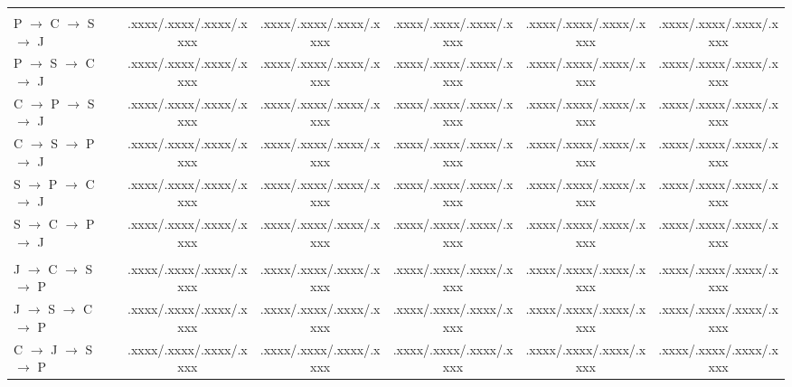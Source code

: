 \documentclass[final,5p,times,twocolumn]{elsarticle}
\theoremstyle{plain}
\begin{document}
\begin{table}[!htbp]
\begin{adjustbox}{width=0.95\textwidth}
\begin{tabular}{@{}lccccc@{}}
\addlinespace[1pt]
\rowcolor{black!7}
\multicolumn{6}{@{}l}{\textit{Target Java (J)}} \\

P $\rightarrow$ C $\rightarrow$ S $\rightarrow$ J
& .xxxx/.xxxx/.xxxx/.xxxx
& .xxxx/.xxxx/.xxxx/.xxxx
& .xxxx/.xxxx/.xxxx/.xxxx
& .xxxx/.xxxx/.xxxx/.xxxx
& .xxxx/.xxxx/.xxxx/.xxxx \\

P $\rightarrow$ S $\rightarrow$ C $\rightarrow$ J
& .xxxx/.xxxx/.xxxx/.xxxx
& .xxxx/.xxxx/.xxxx/.xxxx
& .xxxx/.xxxx/.xxxx/.xxxx
& .xxxx/.xxxx/.xxxx/.xxxx
& .xxxx/.xxxx/.xxxx/.xxxx \\

C $\rightarrow$ P $\rightarrow$ S $\rightarrow$ J
& .xxxx/.xxxx/.xxxx/.xxxx
& .xxxx/.xxxx/.xxxx/.xxxx
& .xxxx/.xxxx/.xxxx/.xxxx
& .xxxx/.xxxx/.xxxx/.xxxx
& .xxxx/.xxxx/.xxxx/.xxxx \\

C $\rightarrow$ S $\rightarrow$ P $\rightarrow$ J
& .xxxx/.xxxx/.xxxx/.xxxx
& .xxxx/.xxxx/.xxxx/.xxxx
& .xxxx/.xxxx/.xxxx/.xxxx
& .xxxx/.xxxx/.xxxx/.xxxx
& .xxxx/.xxxx/.xxxx/.xxxx \\

S $\rightarrow$ P $\rightarrow$ C $\rightarrow$ J
& .xxxx/.xxxx/.xxxx/.xxxx
& .xxxx/.xxxx/.xxxx/.xxxx
& .xxxx/.xxxx/.xxxx/.xxxx
& .xxxx/.xxxx/.xxxx/.xxxx
& .xxxx/.xxxx/.xxxx/.xxxx \\

S $\rightarrow$ C $\rightarrow$ P $\rightarrow$ J
& .xxxx/.xxxx/.xxxx/.xxxx
& .xxxx/.xxxx/.xxxx/.xxxx
& .xxxx/.xxxx/.xxxx/.xxxx
& .xxxx/.xxxx/.xxxx/.xxxx
& .xxxx/.xxxx/.xxxx/.xxxx \\

\addlinespace[1pt]
\rowcolor{black!7}
\multicolumn{6}{@{}l}{\textit{Target Python (P)}} \\

J $\rightarrow$ C $\rightarrow$ S $\rightarrow$ P
& .xxxx/.xxxx/.xxxx/.xxxx
& .xxxx/.xxxx/.xxxx/.xxxx
& .xxxx/.xxxx/.xxxx/.xxxx
& .xxxx/.xxxx/.xxxx/.xxxx
& .xxxx/.xxxx/.xxxx/.xxxx \\

J $\rightarrow$ S $\rightarrow$ C $\rightarrow$ P
& .xxxx/.xxxx/.xxxx/.xxxx
& .xxxx/.xxxx/.xxxx/.xxxx
& .xxxx/.xxxx/.xxxx/.xxxx
& .xxxx/.xxxx/.xxxx/.xxxx
& .xxxx/.xxxx/.xxxx/.xxxx \\

C $\rightarrow$ J $\rightarrow$ S $\rightarrow$ P
& .xxxx/.xxxx/.xxxx/.xxxx
& .xxxx/.xxxx/.xxxx/.xxxx
& .xxxx/.xxxx/.xxxx/.xxxx
& .xxxx/.xxxx/.xxxx/.xxxx
& .xxxx/.xxxx/.xxxx/.xxxx \\


\end{tabular}
\end{adjustbox}
\end{table}
\end{document}
